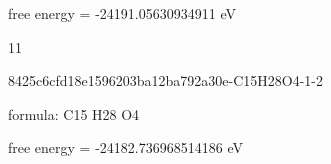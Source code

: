 \documentclass{article}
\begin{document}
free energy = -24191.05630934911 eV

11

\vspace{1cm}


8425c6cfd18e1596203ba12ba792a30e-C15H28O4-1-2



formula: C15 H28 O4



free energy = -24182.736968514186 eV
\end{document}
